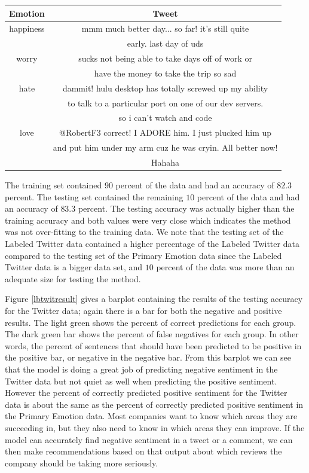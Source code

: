 \documentclass[titlepage,letterpaper]{article}
\begin{document}
 \begin{center}
	\begin{tabular}{ |c|c| } 
		\hline
		Emotion & Tweet \\
		\hline \hline
		happiness & mmm much better day... so far! it's still quite\\
		 & early. last day of uds \\
		\hline
		worry &  sucks not being able to take days off of work or \\
		& have the money to take the trip  so sad \\
		\hline
		hate & dammit! hulu desktop has totally screwed up my ability \\
		& to talk to a particular port on one of our dev servers. \\
		& so i can't watch and code  \\ 
		\hline
		love & @RobertF3 correct! I ADORE him. I just plucked him up \\ 
		& and put him under my arm cuz he was cryin.  All better now! \\ & Hahaha \\
		\hline
	\end{tabular}
	\label{McdonaldsServiceFailureTable}
\end{center}

The training set contained $90$ percent of the data and had an accuracy of $82.3$ percent. The testing set contained the remaining $10$ percent of the data and had an accuracy of $83.3$ percent. The testing accuracy was actually higher than the training accuracy and both values were very close which indicates the method was not over-fitting to the training data. We note that the testing set of the Labeled Twitter data contained a higher percentage of the Labeled Twitter data compared to the testing set of the Primary Emotion data since the Labeled Twitter data is a bigger data set, and $10$ percent of the data was more than an adequate size for testing the method. 

Figure \ref{lbtwitresult} gives a barplot containing the results of the testing accuracy for the Twitter data; again there is a bar for both the negative and positive results. The light green shows the percent of correct predictions for each group. The dark green bar shows the percent of false negatives for each group. In other words, the percent of sentences that should have been predicted to be positive in the positive bar, or negative in the negative bar. From this barplot we can see that the model is doing a great job of predicting negative sentiment in the Twitter data but not quiet as well when predicting the positive sentiment. However the percent of correctly predicted positive sentiment for the Twitter data is about the same as the percent of correctly predicted positive sentiment in the Primary Emotion data. Most companies want to know which areas they are succeeding in, but they also need to know in which areas they can improve. If the model can accurately find negative sentiment in a tweet or a comment, we can then make recommendations based on that output about which reviews the company should be taking more seriously. 
\end{document}
